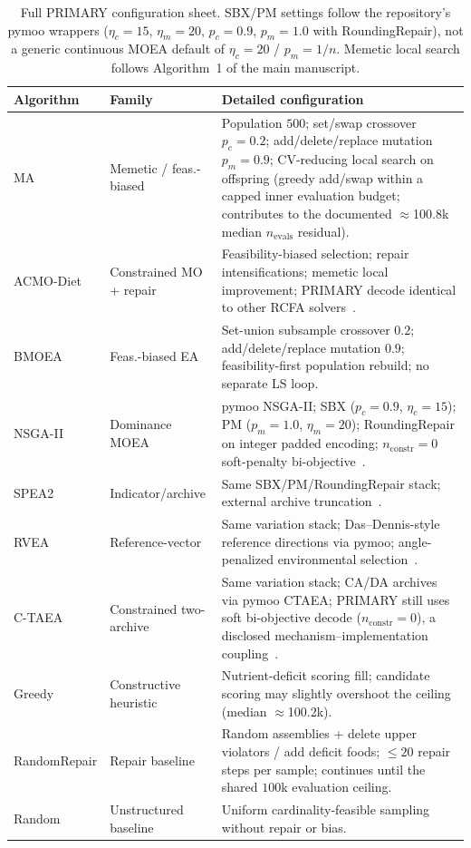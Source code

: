 \documentclass[lettersize,journal,onecolumn]{IEEEtran}
\begin{document}
\begin{table}[!t]
\centering
\caption{Full PRIMARY configuration sheet.
SBX/PM settings follow the repository's pymoo wrappers ($\eta_c=15$, $\eta_m=20$, $p_c=0.9$, $p_m=1.0$ with RoundingRepair),
not a generic continuous MOEA default of $\eta_c=20$ / $p_m=1/n$.
Memetic local search follows Algorithm~1 of the main manuscript.}
\label{tab:s3}
\scriptsize
\setlength{\tabcolsep}{3pt}
\begin{tabular}{@{}llp{10cm}@{}}
\toprule
Algorithm & Family & Detailed configuration \\
\midrule
MA & Memetic / feas.-biased & Population $500$; set/swap crossover $p_c=0.2$; add/delete/replace mutation $p_m=0.9$;
CV-reducing local search on offspring (greedy add/swap within a capped inner evaluation budget; contributes to the
documented $\approx$100.8k median $n_{\mathrm{evals}}$ residual). \\
ACMO-Diet & Constrained MO + repair & Feasibility-biased selection; repair intensifications; memetic local improvement;
PRIMARY decode identical to other RCFA solvers~\cite{zhao2025acmodiet}. \\
BMOEA & Feas.-biased EA & Set-union subsample crossover $0.2$; add/delete/replace mutation $0.9$;
feasibility-first population rebuild; no separate LS loop. \\
NSGA-II & Dominance MOEA & pymoo NSGA-II; SBX ($p_c=0.9$, $\eta_c=15$); PM ($p_m=1.0$, $\eta_m=20$);
RoundingRepair on integer padded encoding; $n_{\mathrm{constr}}=0$ soft-penalty bi-objective~\cite{deb2002}. \\
SPEA2 & Indicator/archive & Same SBX/PM/RoundingRepair stack; external archive truncation~\cite{zitzler2001}. \\
RVEA & Reference-vector & Same variation stack; Das--Dennis-style reference directions via pymoo;
angle-penalized environmental selection~\cite{cheng2016}. \\
C-TAEA & Constrained two-archive & Same variation stack; CA/DA archives via pymoo CTAEA;
PRIMARY still uses soft bi-objective decode ($n_{\mathrm{constr}}=0$), a disclosed mechanism--implementation coupling~\cite{li2019ctaea}. \\
Greedy & Constructive heuristic & Nutrient-deficit scoring fill; candidate scoring may slightly overshoot the ceiling
(median $\approx$100.2k). \\
RandomRepair & Repair baseline & Random assemblies + delete upper violators / add deficit foods; $\le 20$ repair steps per sample;
continues until the shared $100$k evaluation ceiling. \\
Random & Unstructured baseline & Uniform cardinality-feasible sampling without repair or bias. \\
\bottomrule
\end{tabular}
\end{table}
\end{document}
